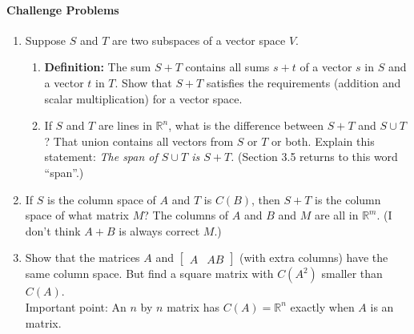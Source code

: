 \documentclass[14pt, a4paper]{article}
\begin{document}
\paragraph{Challenge Problems}
\begin{enumerate}[resume]
    \item Suppose $S$ and $T$ are two subspaces of a vector space $V$.
          \begin{enumerate}
              \item \textbf{Definition:} The sum $S+T$ contains all sums $s+t$ of a vector $s$ in $S$ and a vector $t$ in $T$. Show that $S+T$ satisfies the requirements (addition and scalar multiplication) for a vector space.

              \item If $S$ and $T$ are lines in $\mathbb{R}^n$, what is the difference between $S+T$ and $S\cup T$? That union contains all vectors from $S$ or $T$ or both. Explain this statement: \textit{The span of $S\cup T$ is $S+T$.} (Section 3.5 returns to this word ``span''.)
          \end{enumerate}
    \item If $S$ is the column space of $A$ and $T$ is $C(B)$, then $S+T$ is the column space of what matrix $M$? The columns of $A$ and $B$ and $M$ are all in $\mathbb{R}^m$. (I don't think $A+B$ is always correct $M$.)

    \item Show that the matrices $A$ and $\begin{bmatrix}A & AB\end{bmatrix}$ (with extra columns) have the same column space. But find a square matrix with $C(A^2)$ smaller than $C(A)$. \\Important point:  {\color{blue!60!green}An $n$ by $n$ matrix has $C(A)=\mathbb{R}^n$ exactly when $A$ is an \underline{\hspace{2cm}} matrix.}
\end{enumerate}
\end{document}
